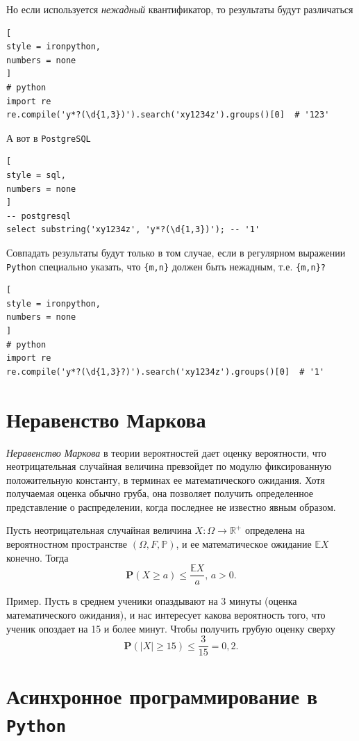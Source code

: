 \documentclass[%
	11pt,
	a4paper,
	utf8,
		]{article}
\begin{document}
Но если используется \emph{нежадный} квантификатор, то результаты будут различаться
\begin{lstlisting}[
style = ironpython,
numbers = none
]
# python
import re
re.compile('y*?(\d{1,3})').search('xy1234z').groups()[0]  # '123'
\end{lstlisting}

А вот в \texttt{PostgreSQL}
\begin{lstlisting}[
style = sql,
numbers = none
]
-- postgresql
select substring('xy1234z', 'y*?(\d{1,3})'); -- '1'
\end{lstlisting}

Совпадать результаты будут только в том случае, если в регулярном выражении \texttt{Python} специально указать, что \verb|{m,n}| должен быть нежадным, т.е. \verb|{m,n}?|
\begin{lstlisting}[
style = ironpython,
numbers = none
]
# python
import re
re.compile('y*?(\d{1,3}?)').search('xy1234z').groups()[0]  # '1'
\end{lstlisting}

\section{Неравенство Маркова}

\emph{Неравенство Маркова} в теории вероятностей дает оценку вероятности, что неотрицательная случайная величина превзойдет по модулю фиксированную положительную константу, в терминах ее математического ожидания. Хотя получаемая оценка обычно груба, она позволяет получить определенное представление о распределении, когда последнее не известно явным образом.

Пусть неотрицательная случайная величина $ X: \Omega \to \mathbb{R}^+ $ определена на вероятностном пространстве $ (\Omega, F, \mathbb{P}) $, и ее математическое ожидание $ \mathbb{E}X $ конечно. Тогда
$$
\mathbf{P}(X \geqslant a) \leqslant \dfrac{\mathbb{E}X}{a}, \, a > 0.
$$

Пример. Пусть в среднем ученики опаздывают на 3 минуты (оценка математического ожидания), и нас интересует какова вероятность того, что ученик опоздает на 15 и более минут. Чтобы получить грубую оценку сверху
$$
\mathbf{P}(|X| \geqslant 15) \leqslant \dfrac{3}{15} = 0,2.
$$


\section{Асинхронное программирование в \texttt{Python}}
\end{document}
